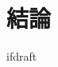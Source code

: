 \documentclass{jsarticle}
\begin{document}
    \fi
    \section{結論}

    \expandafter\ifx\csname ifdraft\endcsname\relax
\end{document}

